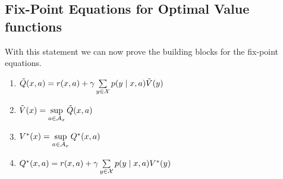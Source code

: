 \subsection{Fix-Point Equations for Optimal Value functions}
With this statement we can now prove the building blocks for the fix-point equations.

\begin{lemma}\label{V*,Q* relation}\leavevmode
\begin{enumerate}[label=(\roman*),font=\normalfont]
\item\label{i:1} \(\tilde{Q}(x,a)= r(x,a)+\gamma\sum\limits_{y\in\mathcal{X}}p(y\mid x,a)\tilde{V}(y)\)
\item\label{i:2} \(\tilde{V}(x)= \sup\limits_{a\in\mathcal{A}_x} \tilde{Q}(x,a)\)
\item\label{i:3} \(V^*(x)=\sup\limits_{a\in\mathcal{A}_x}Q^*(x,a)\)
\item\label{i:4} \(Q^*(x,a)=r(x,a)+\gamma \sum\limits_{y\in\mathcal{X}}p(y\mid x,a) V^*(y)\)
\end{enumerate}
\end{lemma}

